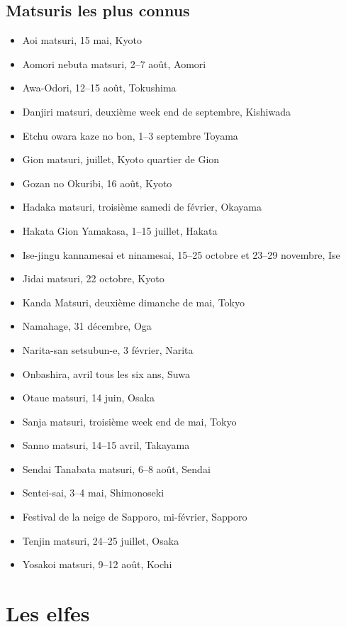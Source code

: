 \section{Matsuris les plus connus}

\begin{itemize}
	\item Aoi matsuri, 15 mai, Kyoto
	\item Aomori nebuta matsuri, 2--7 août, Aomori
	\item Awa-Odori, 12--15 août, Tokushima
	\item Danjiri matsuri, deuxième week end de septembre, Kishiwada
	\item Etchu owara kaze no bon, 1--3 septembre Toyama
	\item Gion matsuri, juillet, Kyoto quartier de Gion
	\item Gozan no Okuribi, 16 août, Kyoto
	\item Hadaka matsuri, troisième samedi de février, Okayama
	\item Hakata Gion Yamakasa, 1--15 juillet, Hakata
	\item Ise-jingu kannamesai et ninamesai, 15--25 octobre et 23--29 novembre, Ise
	\item Jidai matsuri, 22 octobre, Kyoto
	\item Kanda Matsuri, deuxième dimanche de mai, Tokyo
	\item Namahage, 31 décembre, Oga
	\item Narita-san setsubun-e, 3 février, Narita
	\item Onbashira, avril tous les six ans, Suwa
	\item Otaue matsuri, 14 juin, Osaka
	\item Sanja matsuri, troisième week end de mai, Tokyo
	\item Sanno matsuri, 14--15 avril, Takayama
	\item Sendai Tanabata matsuri, 6--8 août, Sendai
	\item Sentei-sai, 3--4 mai, Shimonoseki
	\item Festival de la neige de Sapporo, mi-février, Sapporo
	\item Tenjin matsuri, 24--25 juillet, Osaka
	\item Yosakoi matsuri, 9--12 août, Kochi
\end{itemize}

\chapter{Les elfes}
